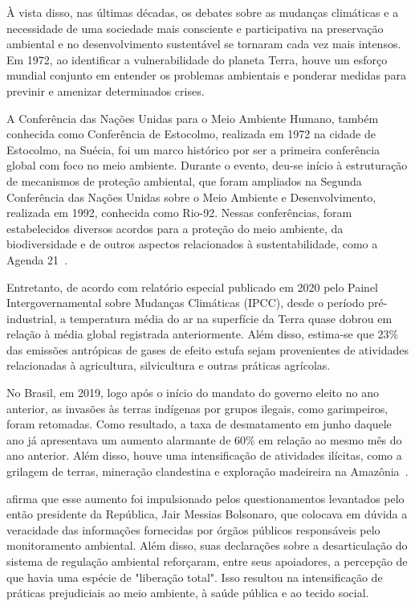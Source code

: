     À vista disso, nas últimas décadas, os debates sobre as mudanças climáticas e a necessidade de uma sociedade 
    mais consciente e participativa na preservação ambiental e no desenvolvimento sustentável se tornaram cada 
    vez mais intensos. Em 1972, ao identificar a vulnerabilidade do planeta Terra, houve um esforço mundial conjunto
    em entender os problemas ambientais e ponderar medidas para previnir e amenizar determinados crises.
    
    A Conferência das Nações Unidas para o Meio Ambiente Humano, também conhecida como Conferência de Estocolmo, 
    realizada em 1972 na cidade de Estocolmo, na Suécia, foi um marco histórico por ser a primeira conferência 
    global com foco no meio ambiente. Durante o evento, deu-se início à estruturação de mecanismos de proteção 
    ambiental, que foram ampliados na Segunda Conferência das Nações Unidas sobre o Meio Ambiente e 
    Desenvolvimento, realizada em 1992, conhecida como Rio-92. Nessas conferências, foram estabelecidos 
    diversos acordos para a proteção do meio ambiente, da biodiversidade e de outros aspectos relacionados à 
    sustentabilidade, como a Agenda 21~\cite{passos2009}.

    Entretanto, de acordo com relatório especial publicado em 2020 pelo Painel Intergovernamental sobre Mudanças Climáticas (IPCC), 
    desde o período pré-industrial, a temperatura média do ar na superfície da Terra quase dobrou em relação à média 
    global registrada anteriormente. Além disso, estima-se que 23\% das emissões antrópicas de gases de efeito estufa 
    sejam provenientes de atividades relacionadas à agricultura, silvicultura e outras práticas agrícolas.

    No Brasil, em 2019, logo após o início do mandato do governo eleito no ano anterior, as invasões às terras 
    indígenas por grupos ilegais, como garimpeiros, foram retomadas. Como resultado, a taxa de desmatamento em 
    junho daquele ano já apresentava um aumento alarmante de 60\% em relação ao mesmo mês do ano anterior. 
    Além disso, houve uma intensificação de atividades ilícitas, como a grilagem de terras, mineração clandestina 
    e exploração madeireira na Amazônia~\cite{barretto2020}.

     afirma que esse aumento foi impulsionado pelos questionamentos levantados pelo então 
    presidente da República, Jair Messias Bolsonaro, que colocava em dúvida a veracidade das informações fornecidas 
    por órgãos públicos responsáveis pelo monitoramento ambiental. Além disso, suas declarações sobre a desarticulação do sistema 
    de regulação ambiental reforçaram, entre seus apoiadores, a percepção de que havia uma espécie de "liberação total". Isso
    resultou na intensificação de práticas prejudiciais ao meio ambiente, à saúde pública e ao tecido social.


